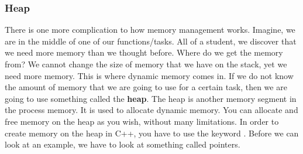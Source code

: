 \documentclass[../notebook.tex]{subfiles}
\begin{document}
\subsubsection{Heap}
There is one more complication to how memory management works. Imagine, we are in the middle of one of our functions/tasks. All of a student, we discover that we need more memory than we thought before. Where do we get the memory from? We cannot change the size of memory that we have on the stack, yet we need more memory. This is where dynamic memory comes in. If we do not know the amount of memory that we are going to use for a certain task, then we are going to use something called the {\bf heap}. The heap is another memory segment in the process memory. It is used to allocate dynamic memory. You can allocate and free memory on the heap as you wish, without many limitations. In order to create memory on the heap in C++, you have to use the keyword . Before we can look at an example, we have to look at something called pointers.
\end{document}
